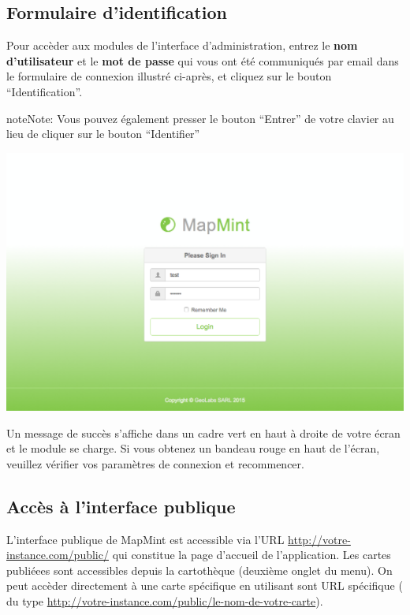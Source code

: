 \documentclass[letterpaper,10pt,french]{sphinxmanual}
\begin{document}
\subsection{Formulaire d'identification}
\label{introduction/usemapmint:formulaire-d-identification}
Pour accèder aux modules de l'interface d'administration, entrez le \textbf{nom d'utilisateur} et le \textbf{mot de passe} qui vous ont été communiqués par email dans le formulaire de connexion illustré ci-après, et cliquez sur le bouton ``Identification''.

\begin{notice}{note}{Note:}
Vous pouvez également presser le bouton ``Entrer'' de votre clavier au lieu de cliquer sur le bouton ``Identifier''
\end{notice}

\includegraphics{login-screen.png}

Un message de succès s'affiche dans un cadre vert en haut à droite de votre écran et le module se charge. Si vous obtenez un bandeau rouge en haut de l'écran, veuillez vérifier vos paramètres de connexion et recommencer.


\subsection{Accès à l'interface publique}
\label{introduction/usemapmint:introduction-usemapmint-public-access}\label{introduction/usemapmint:acces-a-l-interface-publique}
L'interface publique de MapMint est accessible via l'URL
\href{http://votre-instance.com/public/}{http://votre-instance.com/public/} qui constitue la page d'accueil de
l'application. Les cartes publiéees sont accessibles depuis la
cartothèque (deuxième onglet du menu). On peut accèder directement à
une carte spécifique en utilisant sont URL spécifique ( du type
\href{http://votre-instance.com/public/le-nom-de-votre-carte}{http://votre-instance.com/public/le-nom-de-votre-carte}).
\end{document}
